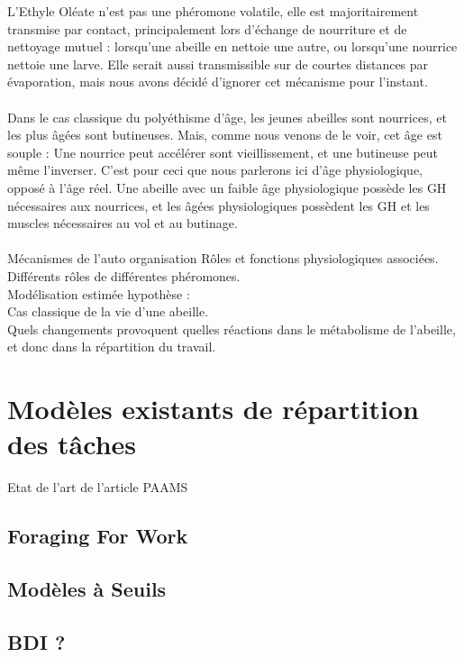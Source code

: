 \documentclass[11pt,a4paper]{report}
\begin{document}
			L'Ethyle Oléate n'est pas une phéromone volatile, elle est majoritairement transmise par contact, principalement lors d'échange de nourriture et de nettoyage mutuel : lorsqu'une abeille en nettoie une autre, ou lorsqu'une nourrice nettoie une larve. Elle serait aussi transmissible sur de courtes distances par évaporation, mais nous avons décidé d'ignorer cet mécanisme pour l'instant.
			
			\paragraph{}
			Dans le cas classique du polyéthisme d'âge, les jeunes abeilles sont nourrices, et les plus âgées sont butineuses. Mais, comme nous venons de le voir, cet âge est souple : Une nourrice peut accélérer sont vieillissement, et une butineuse peut même l'inverser. C'est pour ceci que nous parlerons ici d'âge physiologique, opposé à l'âge réel. Une abeille avec un faible âge physiologique possède les GH nécessaires aux nourrices, et les âgées physiologiques possèdent les GH et les muscles nécessaires au vol et au butinage. 
			
		\paragraph{}
		Mécanismes de l'auto organisation
			Rôles et fonctions physiologiques associées.\\
			Différents rôles de différentes phéromones.\\
			Modélisation estimée hypothèse : \\
			Cas classique de la vie d'une abeille.\\
			Quels changements provoquent quelles réactions dans le métabolisme de l'abeille, et donc dans la répartition du travail.
	\section{Modèles existants de répartition des tâches}
	Etat de l'art de l'article PAAMS
		\subsection{Foraging For Work}
		\subsection{Modèles à Seuils}
		\subsection{BDI ?}
			
\end{document}
